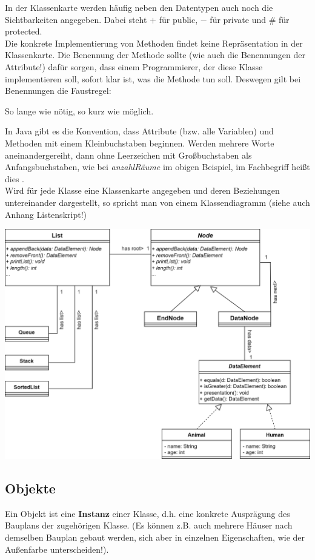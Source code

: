 \documentclass{article}
\begin{document}
In der Klassenkarte werden häufig neben den Datentypen auch noch die Sichtbarkeiten angegeben. Dabei steht $+$ für public, $-$ für private und $\#$ für protected. \\
Die konkrete Implementierung von Methoden findet keine Repräsentation in der Klassenkarte. Die Benennung der Methode sollte (wie auch die Benennungen der Attribute!) dafür sorgen, dass einem Programmierer, der diese Klasse implementieren soll, sofort klar ist, was die Methode tun soll. Deswegen gilt bei Benennungen die Faustregel:
\begin{center}
    So lange wie nötig, so kurz wie möglich. 
\end{center}
In Java gibt es die Konvention, dass Attribute (bzw. alle Variablen) und Methoden mit einem Kleinbuchstaben beginnen. Werden mehrere Worte aneinandergereiht, dann ohne Leerzeichen mit Großbuchstaben als Anfangsbuchstaben, wie bei \textit{anzahlRäume} im obigen Beispiel, im Fachbegriff heißt dies . \\
Wird für jede Klasse eine Klassenkarte angegeben und deren Beziehungen untereinander dargestellt, so spricht man von einem Klassendiagramm (siehe auch Anhang Listenskript!) 
\newpage
{} \\
\begin{center}
    \includegraphics[scale=0.2]{../media/adapter_lists.png}
\end{center}

\subsection{Objekte}
Ein Objekt ist eine \textbf{Instanz} einer Klasse, d.h. eine konkrete Ausprägung des Bauplans der zugehörigen Klasse. (Es können z.B. auch mehrere Häuser nach demselben Bauplan gebaut werden, sich aber in einzelnen Eigenschaften, wie der Außenfarbe unterscheiden!). \\
\end{document}
